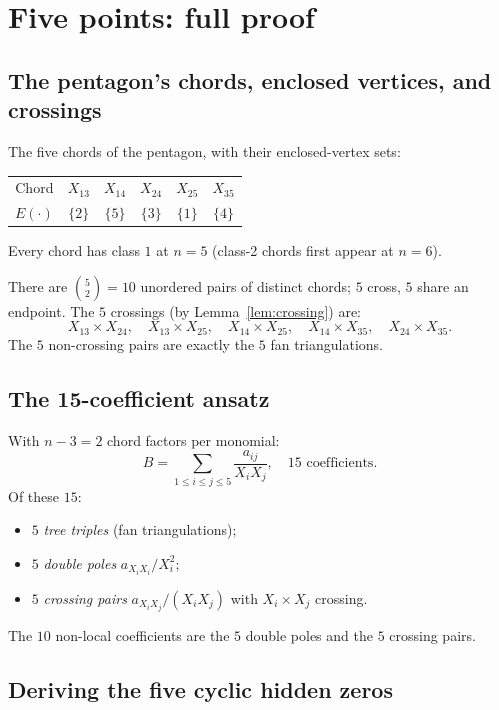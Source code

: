 \documentclass[11pt]{article}
\newcommand{\X}[2]{X_{#1#2}}
\newcommand{\Enc}{E}
\theoremstyle{definition}
\begin{document}
\section{Five points: full proof}
\label{sec:n5}

\subsection{The pentagon's chords, enclosed vertices, and crossings}

The five chords of the pentagon, with their enclosed-vertex sets:
\begin{center}
\begin{tabular}{cccccc}
\toprule
Chord & $\X{1}{3}$ & $\X{1}{4}$ & $\X{2}{4}$ & $\X{2}{5}$ & $\X{3}{5}$ \\
$\Enc(\cdot)$ & $\{2\}$ & $\{5\}$ & $\{3\}$ & $\{1\}$ & $\{4\}$ \\
\bottomrule
\end{tabular}
\end{center}
Every chord has class $1$ at $n=5$ (class-2 chords first appear at $n=6$).

There are $\binom{5}{2}=10$ unordered pairs of distinct chords; $5$ cross,
$5$ share an endpoint. The $5$ crossings (by Lemma~\ref{lem:crossing}) are:
\[
\X{1}{3}\times\X{2}{4},\quad \X{1}{3}\times\X{2}{5},\quad \X{1}{4}\times\X{2}{5},\quad \X{1}{4}\times\X{3}{5},\quad \X{2}{4}\times\X{3}{5}.
\]
The $5$ non-crossing pairs are exactly the $5$ fan triangulations.

\subsection{The 15-coefficient ansatz}

With $n-3=2$ chord factors per monomial:
\[
B = \sum_{1\le i\le j\le 5}\frac{a_{ij}}{X_i X_j},\quad\text{15 coefficients.}
\]
Of these $15$:
\begin{itemize}[nosep,leftmargin=2em]
\item $5$ \emph{tree triples} (fan triangulations);
\item $5$ \emph{double poles} $a_{X_i X_i}/X_i^2$;
\item $5$ \emph{crossing pairs} $a_{X_i X_j}/(X_i X_j)$ with
  $X_i\times X_j$ crossing.
\end{itemize}
The $10$ non-local coefficients are the $5$ double poles and the $5$
crossing pairs.

\subsection{Deriving the five cyclic hidden zeros}
\end{document}
